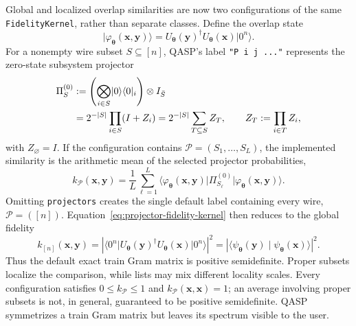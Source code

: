 \documentclass[10pt]{article}
\newcommand{\code}[1]{\texttt{#1}}
\begin{document}
Global and localized overlap similarities are now two configurations of the
same \code{FidelityKernel}, rather than separate classes.  Define the overlap
state
\begin{equation}
  \lvert\varphi_{\bm\theta}(\bm{x},\bm{y})\rangle
  =U_{\bm\theta}(\bm{y})^\dagger
   U_{\bm\theta}(\bm{x})\lvert0^n\rangle.
  \label{eq:kernel-overlap-state}
\end{equation}
For a nonempty wire subset $S\subseteq[n]$, QASP's label
\code{"P i j ..."} represents the zero-state subsystem projector
\begin{align}
  \Pi_S^{(0)}
  &:=\left(\bigotimes_{i\in S}\lvert0\rangle\langle0\rvert_i\right)
     \otimes I_{\bar S} \notag\\
  &=2^{-|S|}\prod_{i\in S}(I+Z_i)
   =2^{-|S|}\sum_{T\subseteq S}Z_T,
  \qquad Z_T:=\prod_{i\in T}Z_i,
  \label{eq:fidelity-projector-expansion}
\end{align}
with $Z_\varnothing=I$.  If the configuration contains
$\mathcal P=(S_1,\ldots,S_L)$, the implemented similarity is the arithmetic
mean of the selected projector probabilities,
\begin{equation}
  k_{\mathcal P}(\bm{x},\bm{y})
  =\frac{1}{L}\sum_{\ell=1}^{L}
    \langle\varphi_{\bm\theta}(\bm{x},\bm{y})\rvert
    \Pi_{S_\ell}^{(0)}
    \lvert\varphi_{\bm\theta}(\bm{x},\bm{y})\rangle.
  \label{eq:projector-fidelity-kernel}
\end{equation}
Omitting \code{projectors} creates the single default label containing every
wire, $\mathcal P=([n])$.  Equation~\eqref{eq:projector-fidelity-kernel} then
reduces to the global fidelity
\begin{equation}
  k_{[n]}(\bm{x},\bm{y})
  =\left|\langle0^n\rvert U_{\bm\theta}(\bm{y})^\dagger
    U_{\bm\theta}(\bm{x})\lvert0^n\rangle\right|^2
  =\left|\langle\psi_{\bm\theta}(\bm{y})
    \mid\psi_{\bm\theta}(\bm{x})\rangle\right|^2.
  \label{eq:global-fidelity-kernel}
\end{equation}
Thus the default exact train Gram matrix is positive semidefinite.  Proper
subsets localize the comparison, while lists may mix different locality
scales.  Every configuration satisfies $0\leq k_{\mathcal P}\leq1$ and
$k_{\mathcal P}(\bm{x},\bm{x})=1$; an average involving proper subsets is not,
in general, guaranteed to be positive semidefinite.  QASP symmetrizes a train
Gram matrix but leaves its spectrum visible to the user.
\end{document}
